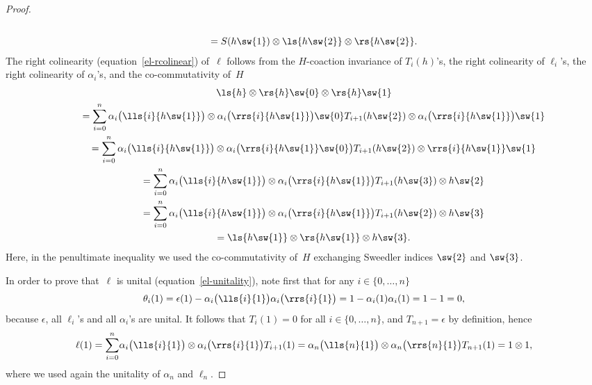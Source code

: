 \begin{proof}
\begin{gather*}
\\
\qquad=
S(h\sw{1})\otimes\ls{h\sw{2}}\otimes\rs{h\sw{2}}.
\end{gather*}
The right colinearity %
(equation~\eqref{el-rcolinear}) of~$\ell$ follows from the $H$-coaction invariance of $T_i(h)$'s,
the right colinearity of $\ell_i$'s, the right colinearity of $\alpha_i$'s, and the co-commutativity of~$H$
\begin{gather*}
\ls{h}\otimes\rs{h}\sw{0}\otimes\rs{h}\sw{1}
\\
\qquad=
\sum\limits_{i=0}^n\alpha_i\big(\lls{i}{h\sw{1}}\big)\otimes
\alpha_i\big(\rrs{i}{h\sw{1}}\big)\sw{0}T_{i+1}(h\sw{2})\otimes\alpha_i\big(\rrs{i}{h\sw{1}}\big)\sw{1}
\\
\qquad=
\sum\limits_{i=0}^n\alpha_i\big(\lls{i}{h\sw{1}}\big)\otimes
\alpha_i\big(\rrs{i}{h\sw{1}}\sw{0}\big)T_{i+1}(h\sw{2})\otimes\rrs{i}{h\sw{1}}\sw{1}
\\
\qquad=
\sum\limits_{i=0}^n\alpha_i\big(\lls{i}{h\sw{1}}\big)\otimes \alpha_i\big(\rrs{i}{h\sw{1}}\big)T_{i+1}(h\sw{3})\otimes h\sw{2}
\\
\qquad=
\sum\limits_{i=0}^n\alpha_i\big(\lls{i}{h\sw{1}}\big)\otimes \alpha_i\big(\rrs{i}{h\sw{1}}\big)T_{i+1}(h\sw{2})\otimes h\sw{3}
\\
\qquad=
\ls{h\sw{1}}\otimes\rs{h\sw{1}}\otimes h\sw{3}.
\end{gather*}
Here, in the penultimate inequality we used the co-commutativity of~$H$ exchanging Sweedler indices $\sw{2}$ and $\sw{3}$.

In order to prove that~$\ell$ is unital (equation~\eqref{el-unitality}), note f\/irst that for any $i\in\{0,\ldots,n\}$
\begin{gather*}
\theta_i(1)={\epsilon}(1)-\alpha_i\big(\lls{i}{1}\big)\alpha_{i}\big(\rrs{i}{1}\big)=1-\alpha_i(1)\alpha_i(1)=1-1=0,
\end{gather*}
because ${\epsilon}$, all $\ell_i$'s and all $\alpha_i$'s are unital.
It follows that $T_i(1)=0$ for all $i\in\{0,\ldots,n\}$, and $T_{n+1}={\epsilon}$ by def\/inition, hence
\begin{gather*}
\ell(1)=\sum\limits_{i=0}^n\!\alpha_i\big(\lls{i}{1}\big)\otimes\alpha_i\big(\rrs{i}{1}\big)T_{i+1}(1)
=\alpha_n\big(\lls{n}{1}\big)\otimes\alpha_n\big(\rrs{n}{1}\big)T_{n+1}(1)=1\otimes1,
\end{gather*}
where we used again the unitality of $\alpha_n$ and $\ell_n$.


\end{proof}
